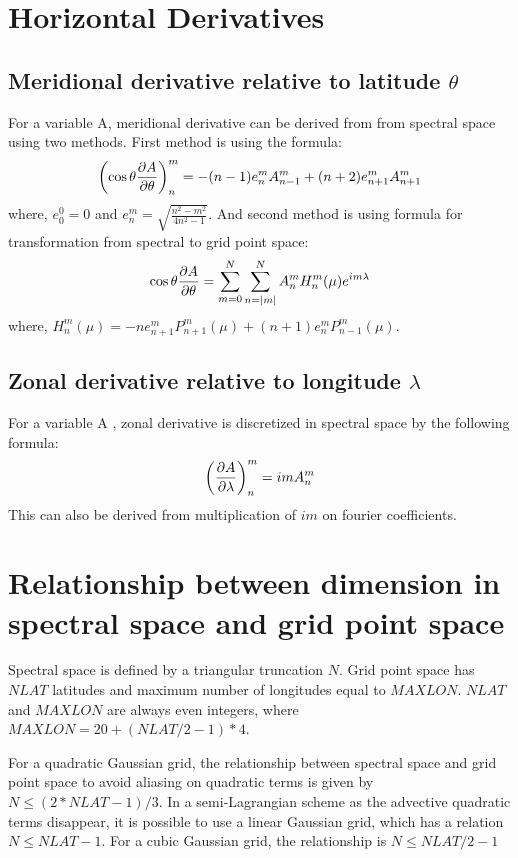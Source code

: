 \documentclass{SBCbookchapter}
\begin{document}
\section{Horizontal Derivatives}
\subsection{Meridional derivative relative to latitude $\theta$ }
For a variable A, meridional derivative can be derived from from spectral space using two methods. First method is using the formula:
\begin{equation}
\left(\cos\theta\pdv{A}{\theta}\right)_{n}^m = -(n-1)e_{n}^m A_{n-1}^m + 
(n+2)e_{n+1}^m A_{n+1}^m
\end{equation}
where, $e_0^0=0$ and $e_n^m = \sqrt{\frac{n^2-m^2}{4n^2-1}}$. And second method is using formula for transformation from spectral to grid point space:
\begin{equation}
\cos\theta\pdv{A}{\theta} = \sum_{m=0}^{N} \sum_{n=|m|}^{N} A_{n}^{m} H_{n}^{m} (\mu) e^{im\lambda}
\end{equation}
where, $H_n^m(\mu) = -ne_{n+1}^m P_{n+1}^m(\mu) + (n+1)e_n^m P_{n-1}^m(\mu)$.

\subsection{Zonal derivative relative to longitude $\lambda$}
For a variable A , zonal derivative is discretized in spectral space by the
following formula:
\begin{equation}
\left(\pdv{A}{\lambda}\right)_n^m = imA_n^m
\end{equation}
This can also be derived from multiplication of $im$ on fourier coefficients.

\section{Relationship between dimension in spectral space and grid point space}
Spectral space is defined by a triangular truncation $N$. Grid point space has $NLAT$ latitudes and maximum number of longitudes equal to $MAXLON$. $NLAT$ and $MAXLON$ are always even integers, where $MAXLON=20+(NLAT/2-1)*4$.

For a quadratic Gaussian grid, the relationship between spectral space and grid point space to avoid aliasing on quadratic terms is given by $N \leq (2*NLAT-1)/3$.
In a semi-Lagrangian scheme as the advective quadratic terms disappear, it is possible to use a linear Gaussian grid, which has a relation $N \leq NLAT-1$.
For a cubic Gaussian grid, the relationship is $N \leq NLAT/2 -1 $
\end{document}
